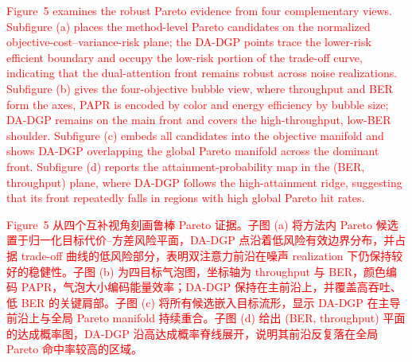 \documentclass[11pt]{article}
\begin{document}
\textcolor{red}{Figure~5 examines the robust Pareto evidence from four complementary views. Subfigure (a) places the method-level Pareto candidates on the normalized objective-cost--variance-risk plane; the DA-DGP points trace the lower-risk efficient boundary and occupy the low-risk portion of the trade-off curve, indicating that the dual-attention front remains robust across noise realizations. Subfigure (b) gives the four-objective bubble view, where throughput and BER form the axes, PAPR is encoded by color and energy efficiency by bubble size; DA-DGP remains on the main front and covers the high-throughput, low-BER shoulder. Subfigure (c) embeds all candidates into the objective manifold and shows DA-DGP overlapping the global Pareto manifold across the dominant front. Subfigure (d) reports the attainment-probability map in the (BER, throughput) plane, where DA-DGP follows the high-attainment ridge, suggesting that its front repeatedly falls in regions with high global Pareto hit rates.}%

\textcolor{red}{Figure~5 从四个互补视角刻画鲁棒 Pareto 证据。子图 (a) 将方法内 Pareto 候选置于归一化目标代价--方差风险平面，DA-DGP 点沿着低风险有效边界分布，并占据 trade-off 曲线的低风险部分，表明双注意力前沿在噪声 realization 下仍保持较好的稳健性。子图 (b) 为四目标气泡图，坐标轴为 throughput 与 BER，颜色编码 PAPR，气泡大小编码能量效率；DA-DGP 保持在主前沿上，并覆盖高吞吐、低 BER 的关键肩部。子图 (c) 将所有候选嵌入目标流形，显示 DA-DGP 在主导前沿上与全局 Pareto manifold 持续重合。子图 (d) 给出 (BER, throughput) 平面的达成概率图，DA-DGP 沿高达成概率脊线展开，说明其前沿反复落在全局 Pareto 命中率较高的区域。}%
\end{document}
